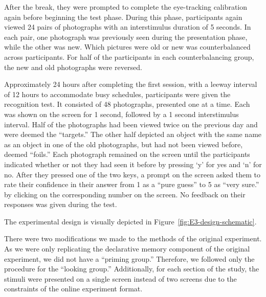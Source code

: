 \documentclass[
  man,floatsintext]{apa6}
\begin{document}
After the break, they were prompted to complete the eye-tracking
calibration again before beginning the test phase. During this phase,
participants again viewed 24 pairs of photographs with an interstimulus
duration of 5 seconds. In each pair, one photograph was previously seen
during the presentation phase, while the other was new. Which pictures
were old or new was counterbalanced across participants.
For half of the participants in each counterbalancing group, the new and
old photographs were
reversed.

Approximately 24 hours after completing the first session, with a leeway
interval of 12 hours to accommodate busy schedules, participants were
given the recognition test. It consisted of 48 photographs, presented
one at a time. Each was shown on the screen for 1 second, followed by a
1 second interstimulus interval. Half of the photographs had been
viewed twice on the previous day and were deemed the ``targets.'' The
other half depicted an object with the same name as an object in one of
the old photographs, but had not been viewed before, deemed ``foils.''
Each photograph remained on the screen until the participants indicated
whether or not they had seen it before by pressing `y' for yes and `n'
for no. After they pressed one of the two keys, a prompt on the screen
asked them to rate their confidence in their answer from 1 as a ``pure
guess'' to 5 as ``very sure.'' by clicking on the corresponding number on
the screen. No feedback on their responses was given during the test.

The experimental design is visually depicted in Figure~\ref{fig:E3-design-schematic}.

There were two modifications we made to the methods of the original
experiment. As we were only replicating the declarative memory component
of the original experiment, we did not have a ``priming group.''
Therefore, we followed only the procedure for the ``looking group.''
Additionally, for each section of the study, the stimuli were presented
on a single screen instead of two screens due to the constraints of the
online experiment format.
\end{document}
